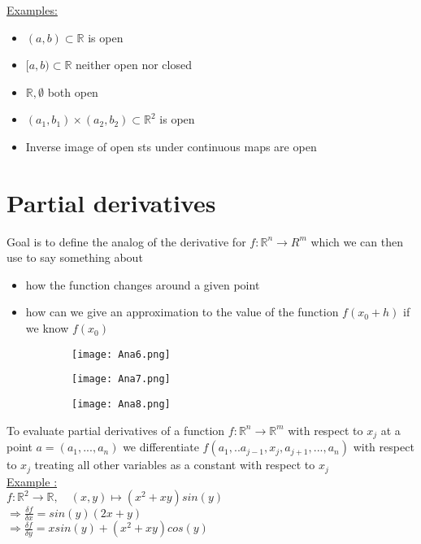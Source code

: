 \documentclass[8pt]{extreport}
\newcommand{\R}{\mathbb{R}}
\begin{document}
\underline{Examples:}
\begin{itemize}
\item $(a,b) \subset \R$ is open
\item $[a,b) \subset \R$ neither open nor closed
\item $\R, \emptyset$ both open
\item $(a_1,b_1) \times (a_2,b_2) \subset \R^2$ is open
\item Inverse image of open sts under continuous maps are open
\end{itemize}

\section{Partial derivatives}

Goal is to define the analog of the derivative for $f:\R^n \to R^m$
which we can then use to say something about 
\begin{itemize}
\item how the function changes around a given point
\item how can we give an approximation to the value of the function $f(x_0 + h)$ if we know $f(x_0)$
\end{itemize}
\begin{figure}[H]
\centering
\begin{subfigure}[b]{0.4\linewidth}
\texttt{[image: Ana6.png]}
\end{subfigure}
\begin{subfigure}[b]{0.7\linewidth}
\texttt{[image: Ana7.png]}
\end{subfigure}
\begin{subfigure}[b]{0.6\linewidth}
\texttt{[image: Ana8.png]}
\end{subfigure}
\end{figure}

To evaluate partial derivatives of a function $f: \R^n \to \R^m$ with respect to $x_j$ at a point $a = (a_1,...,a_n)$ we differentiate
$ f(a_1,..a_{j-1}, x_j, a_{j+1},...,a_n)$ with respect to $x_j$ treating all other variables as a constant with respect to $x_j$\\
\underline{Example  :}\\
$f: \R^2 \to \R, \quad (x,y) \mapsto (x^2 + xy)sin(y)$\\
$\Rightarrow \frac{\delta f}{\delta x} = sin(y)(2x+y)$\\
$\Rightarrow \frac{\delta f}{\delta y} = xsin(y) + (x^2 + xy)cos(y)$\\
\end{document}
